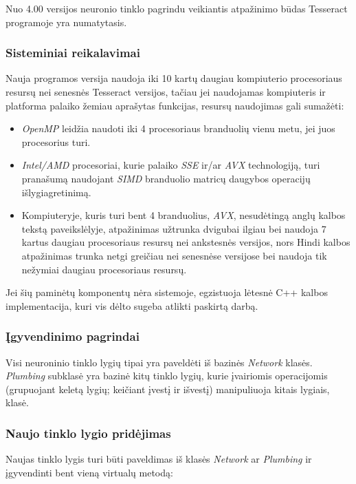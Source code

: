 \documentclass{VUMIFInfBakalaurinis}
\begin{document}
Nuo 4.00 versijos neuronio tinklo pagrindu veikiantis atpažinimo būdas Tesseract programoje yra numatytasis. 

\subsubsection{Sisteminiai reikalavimai}
Nauja programos versija naudoja iki 10 kartų daugiau kompiuterio procesoriaus resursų nei senesnės Tesseract versijos, 
tačiau jei naudojamas kompiuteris ir platforma palaiko žemiau aprašytas funkcijas, resursų naudojimas gali sumažėti:

\begin{itemize}[itemsep=0.5pt]
  \item \textit{OpenMP} leidžia naudoti iki 4 procesoriaus branduolių vienu metu, jei juos procesorius turi.
  \item \textit{Intel/AMD} procesoriai, kurie palaiko \textit{SSE} ir/ar \textit{AVX} technologiją, turi pranašumą naudojant \textit{SIMD} branduolio matricų daugybos operacijų išlygiagretinimą.
  \item Kompiuteryje, kuris turi bent 4 branduolius, \textit{AVX}, nesudėtingą anglų kalbos tekstą paveikslėlyje, atpažinimas užtrunka dvigubai ilgiau bei naudoja 7 kartus daugiau procesoriaus resursų nei ankstesnės versijos, nors Hindi kalbos atpažinimas trunka netgi greičiau nei senesnėse versijose bei naudoja tik nežymiai daugiau procesoriaus resursų.
\end{itemize}

Jei šių paminėtų komponentų nėra sistemoje, egzistuoja lėtesnė C++ kalbos implementacija, kuri vis dėlto sugeba atlikti paskirtą darbą.

\subsubsection{Įgyvendinimo pagrindai}
Visi neuroninio tinklo lygių tipai yra paveldėti iš bazinės \textit{Network} klasės.
\textit{Plumbing} subklasė yra bazinė kitų tinklo lygių, kurie įvairiomis operacijomis (grupuojant keletą lygių; keičiant įvestį ir išvestį) manipuliuoja kitais lygiais, klasė.

\subsubsection{Naujo tinklo lygio pridėjimas}
Naujas tinklo lygis turi būti paveldimas iš klasės \textit{Network} ar \textit{Plumbing} ir įgyvendinti bent vieną virtualų metodą:
\end{document}
